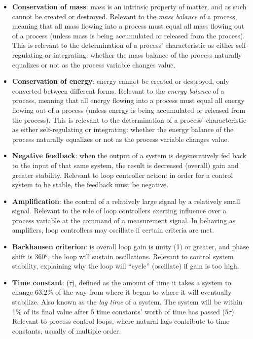 \begin{itemize}
\item \textbf{Conservation of mass}: mass is an intrinsic property of matter, and as such cannot be created or destroyed.  Relevant to the \textit{mass balance} of a process, meaning that all mass flowing into a process must equal all mass flowing out of a process (unless mass is being accumulated or released from the process).  This is relevant to the determination of a process' characteristic as either self-regulating or integrating: whether the mass balance of the process naturally equalizes or not as the process variable changes value.
\item \textbf{Conservation of energy}: energy cannot be created or destroyed, only converted between different forms.  Relevant to the \textit{energy balance} of a process, meaning that all energy flowing into a process must equal all energy flowing out of a process (unless energy is being accumulated or released from the process).  This is relevant to the determination of a process' characteristic as either self-regulating or integrating: whether the energy balance of the process naturally equalizes or not as the process variable changes value.
\item \textbf{Negative feedback}: when the output of a system is degeneratively fed back to the input of that same system, the result is decreased (overall) gain and greater stability.  Relevant to loop controller action: in order for a control system to be stable, the feedback must be negative.
\item \textbf{Amplification}: the control of a relatively large signal by a relatively small signal.  Relevant to the role of loop controllers exerting influence over a process variable at the command of a measurement signal.  In behaving as amplifiers, loop controllers may oscillate if certain criteria are met.
\item \textbf{Barkhausen criterion}: is overall loop gain is unity (1) or greater, and phase shift is 360$^{o}$, the loop will sustain oscillations.  Relevant to control system stability, explaining why the loop will ``cycle'' (oscillate) if gain is too high.
\item \textbf{Time constant}: ($\tau$), defined as the amount of time it takes a system to change 63.2\% of the way from where it began to where it will eventually stabilize.  Also known as the \textit{lag time} of a system.  The system will be within 1\% of its final value after 5 time constants' worth of time has passed ($5 \tau$).  Relevant to process control loops, where natural lags contribute to time constants, usually of multiple order.

\end{itemize}
